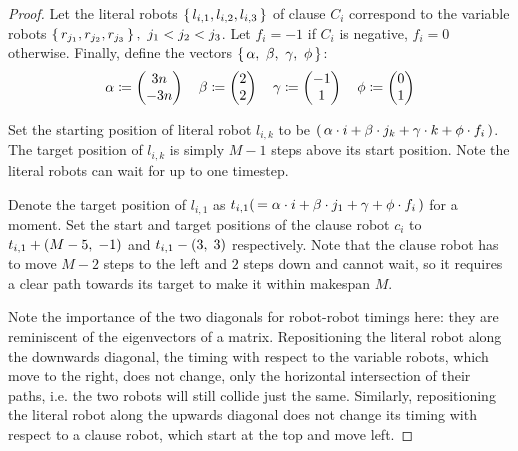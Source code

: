 \begin{proof}

	Let the literal robots \(\set{l_{i,1}, l_{i,2}, l_{i,3}}\) of clause \(C_i\) correspond to the variable robots \(\set{r_{j_1}, r_{j_2}, r_{j_3}},\ j_1 < j_2 < j_3\). 
	Let \(f_i = -1\) if \(C_i\) is negative, \(f_i = 0\) otherwise. 
	Finally, define the vectors \(\set{\alpha,\ \beta,\ \gamma,\ \phi}\):
	\begin{align*}
	\alpha \coloneqq \begin{pmatrix} 3n \\ -3n \end{pmatrix} \quad 
	\beta \coloneqq \begin{pmatrix} 2 \\ 2 \end{pmatrix} \quad 
	\gamma \coloneqq \begin{pmatrix} -1 \\ 1 \end{pmatrix} \quad 
	\phi \coloneqq \begin{pmatrix} 0 \\ 1 \end{pmatrix}
	\end{align*}

	Set the starting position of literal robot \(l_{i,k}\) to be \((\, \alpha \cdot i + \beta \cdot j_k + \gamma \cdot k + \phi \cdot f_i \,)\). 
	The target position of \(l_{i,k}\) is simply \(M - 1\) steps above its start position. 
	Note the literal robots can wait for up to one timestep.


	Denote the target position of \(l_{i,1}\) as \(t_{i,1} (\, = \alpha \cdot i + \beta \cdot j_1 + \gamma + \phi \cdot f_i \,)\) for a moment. 
	Set the start and target positions of the clause robot \(c_i\) to \(t_{i,1} + (M - 5, \; -1)\) and \(t_{i,1} - (3, \; 3)\) respectively. 
	Note that the clause robot has to move \(M - 2\) steps to the left and \(2\) steps down and cannot wait, so it requires a clear path towards its target to make it within makespan \(M\).
	
	Note the importance of the two diagonals for robot-robot timings here: they are reminiscent of the eigenvectors of a matrix. 
	Repositioning the literal robot along the downwards \diagdegs diagonal, the timing with respect to the variable robots, which move to the right, does not change, only the horizontal intersection of their paths, i.e. the two robots will still collide just the same. 
	Similarly, repositioning the literal robot along the upwards diagonal does not change its timing with respect to a clause robot, which start at the top and move left. 


\end{proof}
